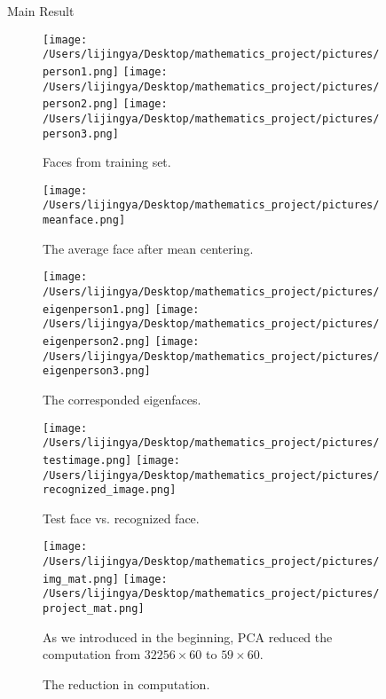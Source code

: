 \documentclass[final]{beamer}
\newlength{\sepwid}
\newlength{\onecolwid}
\newlength{\middlecolwid}
\begin{document}
\begin{frame}[t]
\begin{columns}[t]
\begin{column}{\onecolwid}
\end{column} %


\begin{column}{\sepwid}\end{column} %

\begin{column}{\middlecolwid} %

\begin{alertblock}{Main Result} 
\begin{figure}[h]
\centering
\texttt{[image: /Users/lijingya/Desktop/mathematics\_project/pictures/person1.png]}
\texttt{[image: /Users/lijingya/Desktop/mathematics\_project/pictures/person2.png]}
\texttt{[image: /Users/lijingya/Desktop/mathematics\_project/pictures/person3.png]}
\caption{ Faces from training set.}
\end{figure}
\begin{figure}[h]
\centering
\texttt{[image: /Users/lijingya/Desktop/mathematics\_project/pictures/meanface.png]}
\caption{ The average face after mean centering.}
\end{figure}
\begin{figure}[h]
\centering
\texttt{[image: /Users/lijingya/Desktop/mathematics\_project/pictures/eigenperson1.png]}
\texttt{[image: /Users/lijingya/Desktop/mathematics\_project/pictures/eigenperson2.png]}
\texttt{[image: /Users/lijingya/Desktop/mathematics\_project/pictures/eigenperson3.png]}
\caption{ The corresponded eigenfaces.}
\end{figure}
\begin{figure}[h]
\centering
\texttt{[image: /Users/lijingya/Desktop/mathematics\_project/pictures/testimage.png]}
\texttt{[image: /Users/lijingya/Desktop/mathematics\_project/pictures/recognized\_image.png]}
\caption{ Test face vs. recognized face.}
\end{figure}
\begin{figure}[h]
\centering
\texttt{[image: /Users/lijingya/Desktop/mathematics\_project/pictures/img\_mat.png]}
\texttt{[image: /Users/lijingya/Desktop/mathematics\_project/pictures/project\_mat.png]}
\caption{ The reduction in computation.}
As we introduced in the beginning, PCA reduced the computation from $32256\times60$ to $59\times 60$.
\end{figure}
\vspace{2mm}


\end{alertblock}
\end{column}
\end{columns}
\end{frame}
\end{document}
